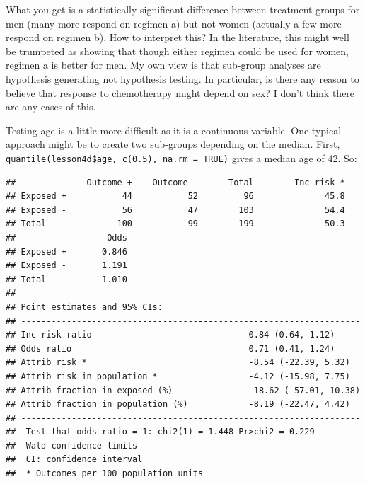 \documentclass[]{book}
\newenvironment{Shaded}{\begin{snugshade}}{\end{snugshade}}
\newcommand{\CommentTok}[1]{\textcolor[rgb]{0.56,0.35,0.01}{\textit{#1}}}
\newcommand{\DataTypeTok}[1]{\textcolor[rgb]{0.13,0.29,0.53}{#1}}
\newcommand{\DecValTok}[1]{\textcolor[rgb]{0.00,0.00,0.81}{#1}}
\newcommand{\KeywordTok}[1]{\textcolor[rgb]{0.13,0.29,0.53}{\textbf{#1}}}
\newcommand{\NormalTok}[1]{#1}
\newcommand{\OperatorTok}[1]{\textcolor[rgb]{0.81,0.36,0.00}{\textbf{#1}}}
\newcommand{\StringTok}[1]{\textcolor[rgb]{0.31,0.60,0.02}{#1}}
\begin{document}
What you get is a statistically significant difference between treatment
groups for men (many more respond on regimen a) but not women (actually
a few more respond on regimen b). How to interpret this? In the
literature, this might well be trumpeted as showing that though either
regimen could be used for women, regimen a is better for men. My own
view is that sub-group analyses are hypothesis generating not hypothesis
testing. In particular, is there any reason to believe that response to
chemotherapy might depend on sex? I don't think there are any cases of
this.

Testing age is a little more difficult as it is a continuous variable.
One typical approach might be to create two sub-groups depending on the
median. First,
\texttt{quantile(lesson4d\$age,\ c(0.5),\ na.rm\ =\ TRUE)} gives a
median age of 42. So:

\begin{Shaded}
\end{Shaded}

\begin{verbatim}
##              Outcome +    Outcome -      Total        Inc risk *
## Exposed +           44           52         96              45.8
## Exposed -           56           47        103              54.4
## Total              100           99        199              50.3
##                  Odds
## Exposed +       0.846
## Exposed -       1.191
## Total           1.010
## 
## Point estimates and 95% CIs:
## -------------------------------------------------------------------
## Inc risk ratio                               0.84 (0.64, 1.12)
## Odds ratio                                   0.71 (0.41, 1.24)
## Attrib risk *                                -8.54 (-22.39, 5.32)
## Attrib risk in population *                  -4.12 (-15.98, 7.75)
## Attrib fraction in exposed (%)               -18.62 (-57.01, 10.38)
## Attrib fraction in population (%)            -8.19 (-22.47, 4.42)
## -------------------------------------------------------------------
##  Test that odds ratio = 1: chi2(1) = 1.448 Pr>chi2 = 0.229
##  Wald confidence limits
##  CI: confidence interval
##  * Outcomes per 100 population units
\end{verbatim}
\end{document}
